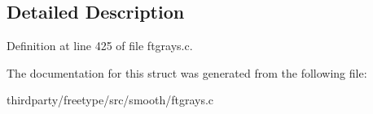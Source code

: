 \subsection{Detailed Description}


Definition at line 425 of file ftgrays.\+c.



The documentation for this struct was generated from the following file\+:\begin{DoxyCompactItemize}
\item 
thirdparty/freetype/src/smooth/ftgrays.\+c\end{DoxyCompactItemize}
